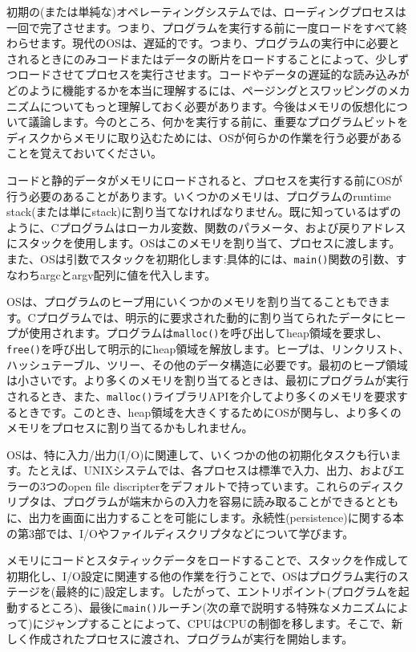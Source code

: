 初期の(または単純な)オペレーティングシステムでは、ローディングプロセスは一回で完了させます。つまり、プログラムを実行する前に一度ロードをすべて終わらせます。現代のOSは、遅延的です。つまり、プログラムの実行中に必要とされるときにのみコードまたはデータの断片をロードすることによって、少しずつロードさせてプロセスを実行させます。コードやデータの遅延的な読み込みがどのように機能するかを本当に理解するには、ページングとスワッピングのメカニズムについてもっと理解しておく必要があります。今後はメモリの仮想化について議論します。今のところ、何かを実行する前に、重要なプログラムビットをディスクからメモリに取り込むためには、OSが何らかの作業を行う必要があることを覚えておいてください。

コードと静的データがメモリにロードされると、プロセスを実行する前にOSが行う必要のあることがあります。いくつかのメモリは、プログラムのruntime
stack(または単にstack)に割り当てなければなりません。既に知っているはずのように、Cプログラムはローカル変数、関数のパラメータ、および戻りアドレスにスタックを使用します。OSはこのメモリを割り当て、プロセスに渡します。また、OSは引数でスタックを初期化します:具体的には、\texttt{main()}関数の引数、すなわちargcとargv配列に値を代入します。

OSは、プログラムのヒープ用にいくつかのメモリを割り当てることもできます。Cプログラムでは、明示的に要求された動的に割り当てられたデータにヒープが使用されます。プログラムは\texttt{malloc()}を呼び出してheap領域を要求し、\texttt{free()}を呼び出して明示的にheap領域を解放します。ヒープは、リンクリスト、ハッシュテーブル、ツリー、その他のデータ構造に必要です。最初のヒープ領域は小さいです。より多くのメモリを割り当てるときは、最初にプログラムが実行されるとき、また、\texttt{malloc()}ライブラリAPIを介してより多くのメモリを要求するときです。このとき、heap領域を大きくするためにOSが関与し、より多くのメモリをプロセスに割り当てるかもしれません。

OSは、特に入力/出力(I/O)に関連して、いくつかの他の初期化タスクも行います。たとえば、UNIXシステムでは、各プロセスは標準で入力、出力、およびエラーの3つのopen
file
discripterをデフォルトで持っています。これらのディスクリプタは、プログラムが端末からの入力を容易に読み取ることができるとともに、出力を画面に出力することを可能にします。永続性(persistence)に関する本の第3部では、I/Oやファイルディスクリプタなどについて学びます。

メモリにコードとスタティックデータをロードすることで、スタックを作成して初期化し、I/O設定に関連する他の作業を行うことで、OSはプログラム実行のステージを(最終的に)設定します。したがって、エントリポイント(プログラムを起動するところ)、最後に\texttt{main()}ルーチン(次の章で説明する特殊なメカニズムによって)にジャンプすることによって、CPUはCPUの制御を移します。そこで、新しく作成されたプロセスに渡され、プログラムが実行を開始します。

